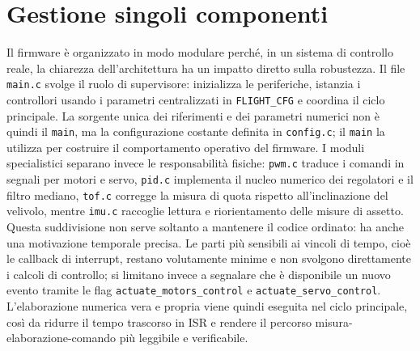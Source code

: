 \documentclass[11pt]{report}
\begin{document}
	\section{Gestione singoli componenti}
	Il firmware è organizzato in modo modulare perché, in un sistema di controllo reale, la chiarezza dell'architettura ha un impatto diretto sulla robustezza. Il file \texttt{main.c} svolge il ruolo di supervisore: inizializza le periferiche, istanzia i controllori usando i parametri centralizzati in \texttt{FLIGHT\_CFG} e coordina il ciclo principale. La sorgente unica dei riferimenti e dei parametri numerici non è quindi il \texttt{main}, ma la configurazione costante definita in \texttt{config.c}; il \texttt{main} la utilizza per costruire il comportamento operativo del firmware. I moduli specialistici separano invece le responsabilità fisiche: \texttt{pwm.c} traduce i comandi in segnali per motori e servo, \texttt{pid.c} implementa il nucleo numerico dei regolatori e il filtro mediano, \texttt{tof.c} corregge la misura di quota rispetto all'inclinazione del velivolo, mentre \texttt{imu.c} raccoglie lettura e riorientamento delle misure di assetto.\\
	Questa suddivisione non serve soltanto a mantenere il codice ordinato: ha anche una motivazione temporale precisa. Le parti più sensibili ai vincoli di tempo, cioè le callback di interrupt, restano volutamente minime e non svolgono direttamente i calcoli di controllo; si limitano invece a segnalare che è disponibile un nuovo evento tramite le flag \texttt{actuate\_motors\_control} e \texttt{actuate\allowbreak\_servo\allowbreak\_control}. L'elaborazione numerica vera e propria viene quindi eseguita nel ciclo principale, così da ridurre il tempo trascorso in ISR e rendere il percorso misura-elaborazione-comando più leggibile e verificabile.
	
\end{document}
